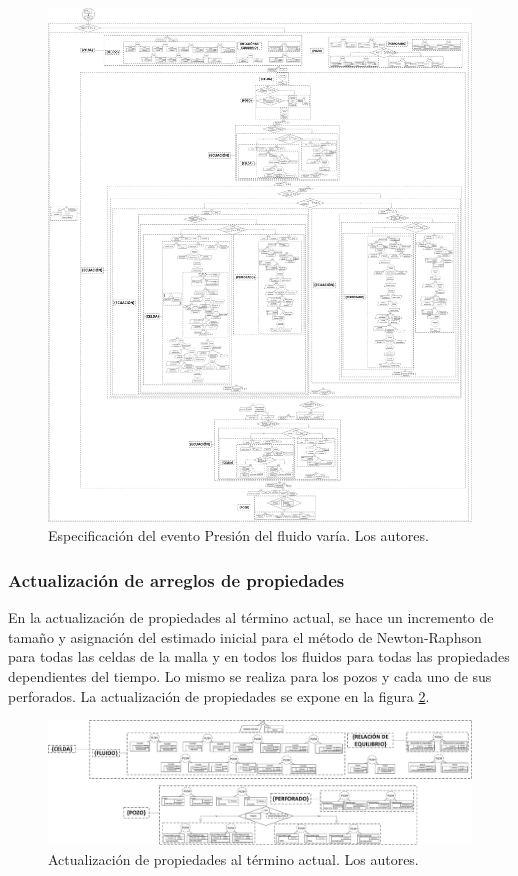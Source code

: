\begin{figure}[h]
	\centering%
	\includegraphics[width=0.9\linewidth]{Fig/PresionVaria.pdf}%
	\caption[Especificación del evento Presión del fluido varía.]{Especificación del evento Presión del fluido varía. Los autores.} \label{fig:FluidPressureVaries}
\end{figure}

\subsubsection{Actualización de arreglos de propiedades}\label{subsec:PS_DefVars}
En la actualización de propiedades al término actual, se hace un incremento de tamaño y asignación del estimado inicial para el método de Newton-Raphson para todas las celdas de la malla y en todos los fluidos para todas las propiedades dependientes del tiempo. Lo mismo se realiza para los pozos y cada uno de sus perforados. La actualización de propiedades se expone en la figura \ref{fig:UpdateProperties}. 

\begin{figure}[h]
	\centering%
	\includegraphics[width=\linewidth]{Fig/ActualizacionDeVariables.pdf}%
	\caption[Actualización de propiedades al término actual.]{Actualización de propiedades al término actual. Los autores.} \label{fig:UpdateProperties}
\end{figure}


